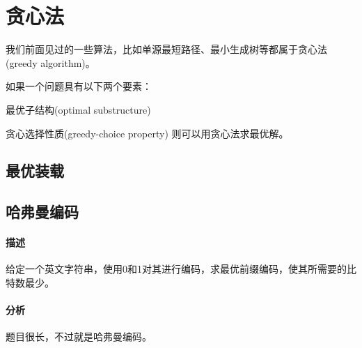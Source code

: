 \chapter{贪心法}
我们前面见过的一些算法，比如单源最短路径、最小生成树等都属于贪心法(greedy algorithm)。

如果一个问题具有以下两个要素：
\begindot
\item 最优子结构(optimal substructure)
\item 贪心选择性质(greedy-choice property)
\myenddot
则可以用贪心法求最优解。


\section{最优装载} %


\section{哈弗曼编码} %
\subsubsection{描述}
给定一个英文字符串，使用0和1对其进行编码，求最优前缀编码，使其所需要的比特数最少。

\subsubsection{分析}
题目很长，不过就是哈弗曼编码。

